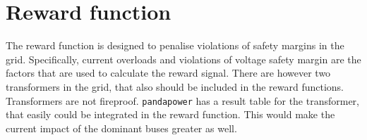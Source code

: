 \documentclass[class=book, crop=false]{standalone}
\begin{document}
\section{Reward function}
The reward function is designed to penalise violations of safety margins in the grid. Specifically, current overloads and violations of voltage safety margin are the factors that are used to calculate the reward signal. There are however two transformers in the grid, that also should be included in the reward functions. Transformers are not fireproof. \texttt{pandapower} has a result table for the transformer, that easily could be integrated in the reward function. This would make the current impact of the dominant buses greater as well. 
\end{document}
